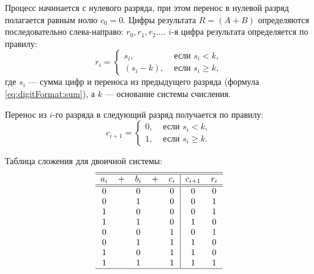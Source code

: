 Процесс начинается с нулевого разряда, при этом перенос в нулевой разряд полагается равным нолю $c_0=0$. Цифры результата $R=(A+B)$ определяются последовательно слева-направо: $r_0,r_1,r_2\ldots$. $i$-я цифра результата определяется по правилу:
\begin{equation}    
    \label{eq:digitFormat:sumDigit}
    r_i = 
        \begin{cases}
            s_i,     &\text{ если $s_i<k$},\\
            (s_i-k), &\text{ если $s_i\ge k$},
        \end{cases}
\end{equation}
где $s_i$ --- сумма цифр и переноса из предыдущего разряда (формула \eqref{eq:digitFormat:sum}), а $k$ --- основание системы счисления.

Перенос из $i$-го разряда в следующий разряд получается по правилу:
\begin{equation}    
    \label{eq:digitFormat:sumCrp}
    c_{i+1} =         
        \begin{cases}
            0, &\text{ если $s_i<k$},\\
            1, &\text{ если $s_i\ge k$}.
        \end{cases}
\end{equation}

Таблица сложения для двоичной системы:
\[
    \begin{tabular}{ccccc|cc}
        \hline\hline
        $a_{i}$ 
          &$+$
              & $b_{i}$ 
                  &$+$
                      & $c_{i}$ 
                          & $c_{i+1}$
                              &  $r_i$ 
                                    \\
        \hline\hline
        0 &   & 0 &   & 0 & 0 & 0 \\
        0 &   & 1 &   & 0 & 0 & 1 \\
        1 &   & 0 &   & 0 & 0 & 1 \\
        1 &   & 1 &   & 0 & 1 & 0 \\
        0 &   & 0 &   & 1 & 0 & 1 \\
        0 &   & 1 &   & 1 & 1 & 0 \\
        1 &   & 0 &   & 1 & 1 & 0 \\
        1 &   & 1 &   & 1 & 1 & 1 \\
        \hline
    \end{tabular}
\]

